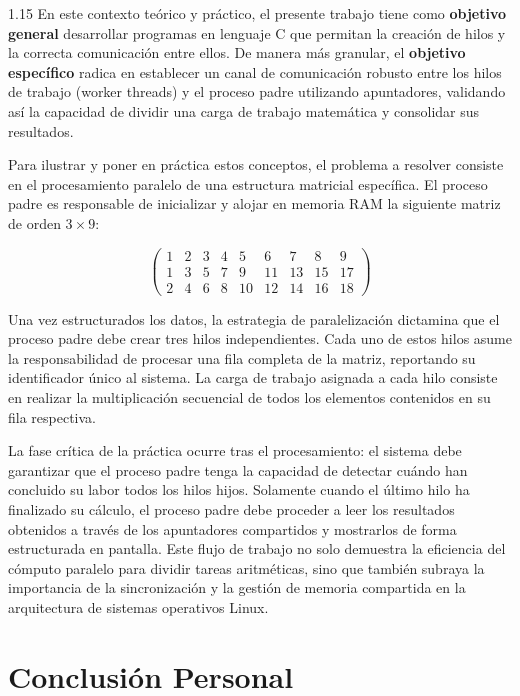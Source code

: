 \documentclass[11pt, a4paper]{article}
\begin{document}
\begin{spacing}{1.15}
En este contexto teórico y práctico, el presente trabajo tiene como \textbf{objetivo general} desarrollar programas en lenguaje C que permitan la creación de hilos y la correcta comunicación entre ellos. De manera más granular, el \textbf{objetivo específico} radica en establecer un canal de comunicación robusto entre los hilos de trabajo (worker threads) y el proceso padre utilizando apuntadores, validando así la capacidad de dividir una carga de trabajo matemática y consolidar sus resultados.

Para ilustrar y poner en práctica estos conceptos, el problema a resolver consiste en el procesamiento paralelo de una estructura matricial específica. El proceso padre es responsable de inicializar y alojar en memoria RAM la siguiente matriz de orden $3 \times 9$:

\begin{equation*}
\begin{pmatrix}
1 & 2 & 3 & 4 & 5 & 6 & 7 & 8 & 9 \\
1 & 3 & 5 & 7 & 9 & 11 & 13 & 15 & 17 \\
2 & 4 & 6 & 8 & 10 & 12 & 14 & 16 & 18
\end{pmatrix}
\end{equation*}

Una vez estructurados los datos, la estrategia de paralelización dictamina que el proceso padre debe crear tres hilos independientes. Cada uno de estos hilos asume la responsabilidad de procesar una fila completa de la matriz, reportando su identificador único al sistema. La carga de trabajo asignada a cada hilo consiste en realizar la multiplicación secuencial de todos los elementos contenidos en su fila respectiva. 

La fase crítica de la práctica ocurre tras el procesamiento: el sistema debe garantizar que el proceso padre tenga la capacidad de detectar cuándo han concluido su labor todos los hilos hijos. Solamente cuando el último hilo ha finalizado su cálculo, el proceso padre debe proceder a leer los resultados obtenidos a través de los apuntadores compartidos y mostrarlos de forma estructurada en pantalla. Este flujo de trabajo no solo demuestra la eficiencia del cómputo paralelo para dividir tareas aritméticas, sino que también subraya la importancia de la sincronización y la gestión de memoria compartida en la arquitectura de sistemas operativos Linux.

\newpage

\section*{Conclusión Personal}


\end{spacing}
\end{document}
